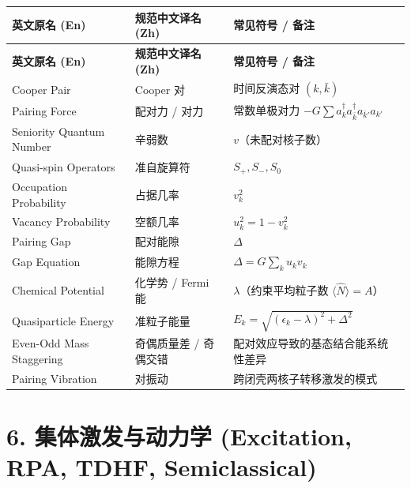 \begin{longtable}{p{4.8cm} p{4.8cm} p{5.0cm}}
\toprule
\textbf{英文原名 (En)} & \textbf{规范中文译名 (Zh)} & \textbf{常见符号 / 备注} \tabularnewline
\midrule
\endfirsthead
\toprule
\textbf{英文原名 (En)} & \textbf{规范中文译名 (Zh)} & \textbf{常见符号 / 备注} \tabularnewline
\midrule
\endhead
\bottomrule
\endfoot
\bottomrule
\endlastfoot
Cooper Pair & Cooper 对 & 时间反演态对 $(k, \bar{k})$ \tabularnewline
Pairing Force & 配对力 / 对力 & 常数单极对力 $-G \sum a_k^\dagger a_{\bar{k}}^\dagger a_{\bar{k}'} a_{k'}$ \tabularnewline
Seniority Quantum Number & 辛弱数 & $v$（未配对核子数） \tabularnewline
Quasi-spin Operators & 准自旋算符 & $S_+, S_-, S_0$ \tabularnewline
Occupation Probability & 占据几率 & $v_k^2$ \tabularnewline
Vacancy Probability & 空额几率 & $u_k^2 = 1 - v_k^2$ \tabularnewline
Pairing Gap & 配对能隙 & $\Delta$ \tabularnewline
Gap Equation & 能隙方程 & $\Delta = G \sum_k u_k v_k$ \tabularnewline
Chemical Potential & 化学势 / Fermi 能 & $\lambda$（约束平均粒子数 $\langle \hat{N} \rangle = A$） \tabularnewline
Quasiparticle Energy & 准粒子能量 & $E_k = \sqrt{(\epsilon_k - \lambda)^2 + \Delta^2}$ \tabularnewline
Even-Odd Mass Staggering & 奇偶质量差 / 奇偶交错 & 配对效应导致的基态结合能系统性差异 \tabularnewline
Pairing Vibration & 对振动 & 跨闭壳两核子转移激发的模式 \tabularnewline
\end{longtable}

\section*{6. 集体激发与动力学 (Excitation, RPA, TDHF, Semiclassical)}

